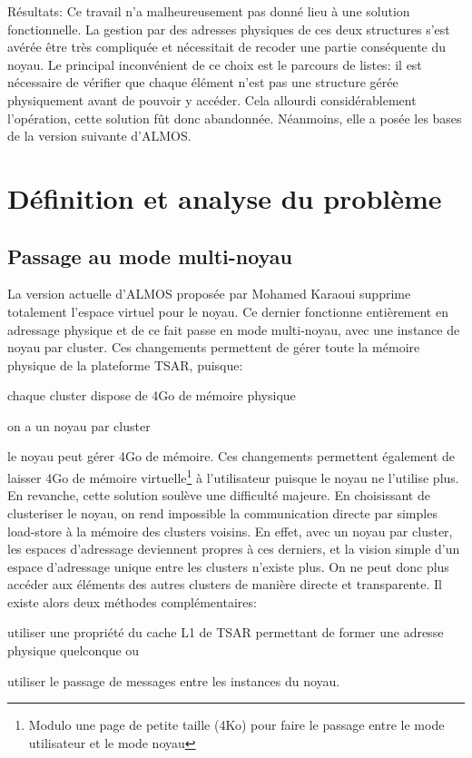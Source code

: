       \begin{paragraph}{Résultats:}
        Ce travail n'a malheureusement pas donné lieu à une solution
        fonctionnelle. La gestion par des adresses physiques de ces deux
        structures s'est avérée être très compliquée et nécessitait de recoder
        une partie conséquente du noyau. Le principal inconvénient de ce choix
        est le parcours de listes: il est nécessaire de vérifier que chaque
        élément n'est pas une structure gérée physiquement avant de pouvoir y
        accéder. Cela allourdi considérablement l'opération, cette solution fût
        donc abandonnée. Néanmoins, elle a posée les bases de la version
        suivante d'ALMOS.
      \end{paragraph}


  \section{Définition et analyse du problème}      

    \subsection{Passage au mode multi-noyau}
    \label{sec:multi-noyau}

      La version actuelle d'ALMOS proposée par Mohamed Karaoui supprime
      totalement l'espace virtuel pour le noyau. Ce dernier fonctionne
      entièrement en adressage physique et de ce fait passe en mode multi-noyau,
      avec une instance de noyau par cluster. Ces changements permettent de
      gérer toute la mémoire physique de la plateforme TSAR,
      puisque:\benumline \item chaque cluster dispose de 4Go de mémoire
      physique \item on a un noyau par cluster \item le noyau peut gérer 4Go de
      mémoire\eenumline. Ces changements permettent également de laisser 4Go de
      mémoire virtuelle\footnote{Modulo une page de petite taille (4Ko) pour
        faire le passage entre le mode utilisateur et le mode noyau} à
      l'utilisateur puisque le noyau ne l'utilise plus.\\

      En revanche, cette solution soulève une difficulté majeure. En choisissant
      de clusteriser le noyau, on rend impossible la communication directe par
      simples load-store à la mémoire des clusters voisins. En effet, avec un
      noyau par cluster, les espaces d'adressage deviennent propres à ces
      derniers, et la vision simple d'un espace d'adressage unique entre les
      clusters n'existe plus. On ne peut donc plus accéder aux éléments des
      autres clusters de manière directe et transparente. Il existe alors deux
      méthodes complémentaires:\benumline \item utiliser une propriété du cache
      L1 de TSAR permettant de former une adresse physique quelconque ou \item
      utiliser le passage de messages entre les instances du noyau\eenumline.\\

